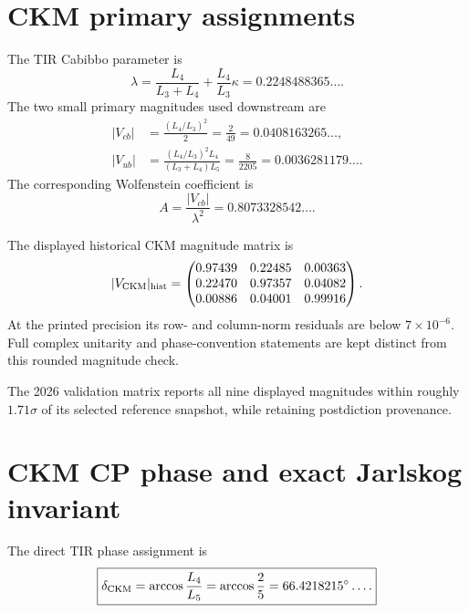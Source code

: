 \section{CKM primary assignments}
The TIR Cabibbo parameter is
\begin{equation}
\boxed{
\lambda
=\frac{L_4}{L_3+L_4}
+\frac{L_4}{L_3}\kappa
=0.2248488365\ldots .
}
\label{eq:v12-ckm-lambda}
\end{equation}
The two small primary magnitudes used downstream are
\begin{align}
|V_{cb}|
&=\frac{(L_4/L_3)^2}{2}
=\frac2{49}
=0.0408163265\ldots,
\label{eq:v12-ckm-vcb}\\
|V_{ub}|
&=\frac{(L_4/L_3)^2L_4}{(L_3+L_4)L_5}
=\frac8{2205}
=0.0036281179\ldots .
\label{eq:v12-ckm-vub}
\end{align}
The corresponding Wolfenstein coefficient is
\begin{equation}
A=\frac{|V_{cb}|}{\lambda^2}
=0.8073328542\ldots .
\label{eq:v12-ckm-A}
\end{equation}

The displayed historical CKM magnitude matrix is
\begin{equation}
|V_{\rm CKM}|_{\rm hist}
=\begin{pmatrix}
0.97439 & 0.22485 & 0.00363\\
0.22470 & 0.97357 & 0.04082\\
0.00886 & 0.04001 & 0.99916
\end{pmatrix}.
\label{eq:v12-ckm-magnitude-matrix}
\end{equation}
At the printed precision its row- and column-norm residuals are below
$7\times10^{-6}$.  Full complex unitarity and phase-convention statements are
kept distinct from this rounded magnitude check.

The 2026 validation matrix reports all nine displayed magnitudes within roughly
$1.71\sigma$ of its selected reference snapshot, while retaining postdiction
provenance.

\section{CKM CP phase and exact Jarlskog invariant}
The direct TIR phase assignment is
\begin{equation}
\boxed{
\delta_{\rm CKM}
=\arccos\frac{L_4}{L_5}
=\arccos\frac25
=66.4218215^\circ\ldots .
}
\label{eq:v12-ckm-delta}
\end{equation}

